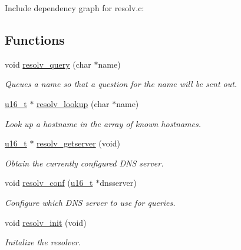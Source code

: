 Include dependency graph for resolv.c:\subsection*{Functions}
\begin{CompactItemize}
\item 
void \hyperlink{a00083_ge4dcbbe6c641d2e3b8537b479df5fc99}{resolv\_\-query} (char $\ast$name)
\begin{CompactList}\small\item\em Queues a name so that a question for the name will be sent out. \item\end{CompactList}\item 
\hyperlink{a00070_gfc6499c1f28697aa3bfc2804d496fd11}{u16\_\-t} $\ast$ \hyperlink{a00083_g66d19181ad5fe8b8f7c84d1f1d46a2ec}{resolv\_\-lookup} (char $\ast$name)
\begin{CompactList}\small\item\em Look up a hostname in the array of known hostnames. \item\end{CompactList}\item 
\hyperlink{a00070_gfc6499c1f28697aa3bfc2804d496fd11}{u16\_\-t} $\ast$ \hyperlink{a00083_g3191066cf8f76bd00b6843b77c37068f}{resolv\_\-getserver} (void)
\begin{CompactList}\small\item\em Obtain the currently configured DNS server. \item\end{CompactList}\item 
void \hyperlink{a00083_gdf916e0c752f5cda70d0bddb2be422ba}{resolv\_\-conf} (\hyperlink{a00070_gfc6499c1f28697aa3bfc2804d496fd11}{u16\_\-t} $\ast$dnsserver)
\begin{CompactList}\small\item\em Configure which DNS server to use for queries. \item\end{CompactList}\item 
\hypertarget{a00083_gb50f78bbf36d912d69f6c1685d0b40e3}{
void \hyperlink{a00083_gb50f78bbf36d912d69f6c1685d0b40e3}{resolv\_\-init} (void)}
\label{a00083_gb50f78bbf36d912d69f6c1685d0b40e3}

\begin{CompactList}\small\item\em Initalize the resolver. \item\end{CompactList}\end{CompactItemize}
